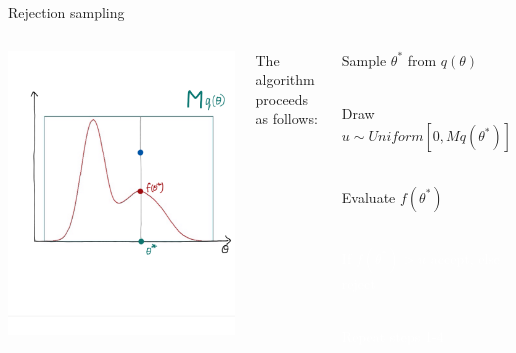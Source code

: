 \documentclass[compress]{beamer}
\begin{document}
\begin{frame}[label=sec-5-6]{Rejection sampling}
    \begin{columns}[c] 
    \includegraphics[width=1\linewidth]{RS5.png}

    The algorithm proceeds as follows:\\
    \begin{enumerate}
        \item Sample $\theta^*$ from $q(\theta)$ \\~\\
        \item Draw $u \sim Uniform[0, Mq(\theta^*)]$ \\~\\
        \item Evaluate $f(\theta^*)$ \\~\\
        \textcolor{white}{
            \item[\color{white}] If $f(\theta^*) > u$ accept, else reject \\~\\
            \item[\color{white}] Repeat steps 1-4
        }
    \end{enumerate}
\end{columns}
\end{frame}
\end{document}
